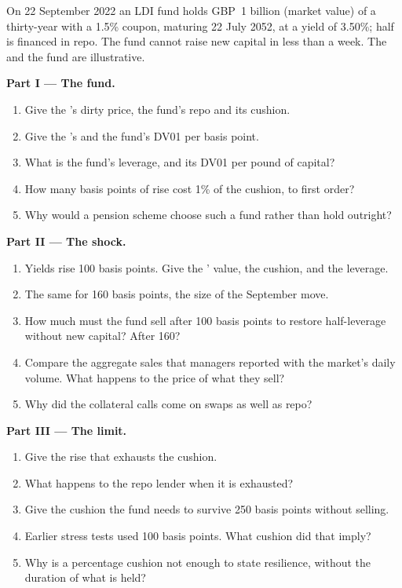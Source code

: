 \begin{problem}\label{pb:m2:european-and-japanese-government-bonds:1}
On 22 September 2022 an LDI fund holds GBP~1 billion (market value) of a
thirty-year  with a 1.5\% coupon, maturing 22 July 2052, at a yield of
3.50\%; half is financed in repo. The fund cannot raise new capital in less
than a week. The  and the fund are illustrative.

\medskip\noindent\textbf{Part I --- The fund.}
\begin{enumerate}
\item Give the 's dirty price, the fund's repo and its cushion.
\item Give the 's  and the fund's DV01 per basis point.
\item What is the fund's leverage, and its DV01 per pound of capital?
\item How many basis points of rise cost 1\% of the cushion, to first order?
\item Why would a pension scheme choose such a fund rather than hold 
outright?
\end{enumerate}

\medskip\noindent\textbf{Part II --- The shock.}
\begin{enumerate}[resume]
\item Yields rise 100 basis points. Give the ' value, the cushion, and the
leverage.
\item The same for 160 basis points, the size of the September move.
\item How much must the fund sell after 100 basis points to restore
half-leverage without new capital? After 160?
\item Compare the aggregate sales that managers reported with the market's daily
volume. What happens to the price of what they sell?
\item Why did the collateral calls come on swaps as well as repo?
\end{enumerate}

\medskip\noindent\textbf{Part III --- The limit.}
\begin{enumerate}[resume]
\item Give the rise that exhausts the cushion.
\item What happens to the repo lender when it is exhausted?
\item Give the cushion the fund needs to survive 250 basis points without
selling.
\item Earlier stress tests used 100 basis points. What cushion did that imply?
\item Why is a percentage cushion not enough to state resilience, without the
duration of what is held?
\end{enumerate}


\end{problem}
